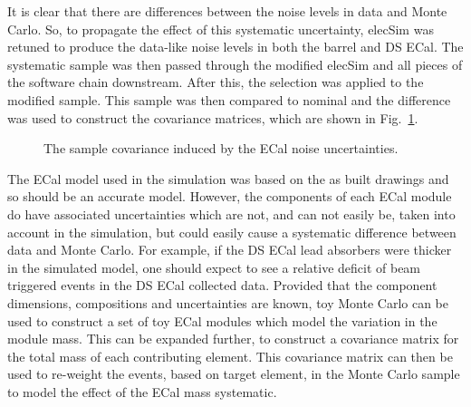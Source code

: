 It is clear that there are differences between the noise levels in data and Monte Carlo.  So, to propagate the effect of this systematic uncertainty, elecSim was retuned to produce the data-like noise levels in both the barrel and DS ECal.  The systematic sample was then passed through the modified elecSim and all pieces of the software chain downstream.  After this, the selection was applied to the modified sample.  This sample was then compared to nominal and the difference was used to construct the covariance matrices, which are shown in Fig.~\ref{fig:ECalNoiseCovarianceMatrices}.
\begin{figure}%
  \centering
  \caption{The sample covariance induced by the ECal noise uncertainties.}
  \label{fig:ECalNoiseCovarianceMatrices}
\end{figure}
\newline
\newline
The ECal model used in the simulation was based on the as built drawings and so should be an accurate model.  However, the components of each ECal module do have associated uncertainties which are not, and can not easily be, taken into account in the simulation, but could easily cause a systematic difference between data and Monte Carlo.  For example, if the DS ECal lead absorbers were thicker in the simulated model, one should expect to see a relative deficit of beam triggered events in the DS ECal collected data.  Provided that the component dimensions, compositions and uncertainties are known, toy Monte Carlo can be used to construct a set of toy ECal modules which model the variation in the module mass.  This can be expanded further, to construct a covariance matrix for the total mass of each contributing element.  This covariance matrix can then be used to re-weight the events, based on target element, in the Monte Carlo sample to model the effect of the ECal mass systematic.  
